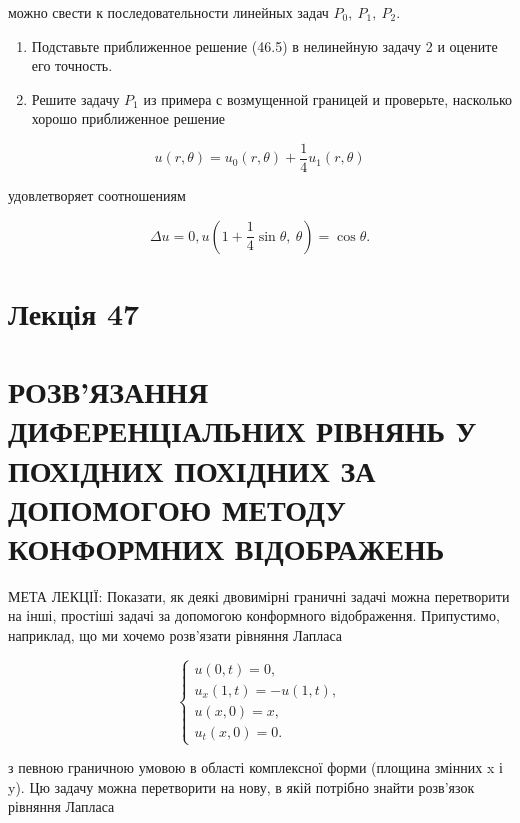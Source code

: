 \documentclass[
  ukrainian,
]{article}
\begin{document}
можно свести к последовательности линейных задач \(P_0,\ P_1,\ P_2\).

\begin{enumerate}
\def\labelenumi{\arabic{enumi}.}
\setcounter{enumi}{2}
\item
  Подставьте приближенное решение (46.5) в нелинейную задачу 2 и оцените
  его точность.
\item
  Решите задачу \(P_1\) из примера с возмущенной границей и проверьте,
  насколько хорошо приближенное решение
\end{enumerate}

\[
u(r,\theta) = u_0(r,\theta) + \frac{1}{4}u_1(r,\theta)
\]

удовлетворяет соотношениям

\[
\Delta u = 0,
u\left(1 + \frac{1}{4}\sin\theta,\ \theta\right) = \cos\theta.
\]

\section{Лекція 47}\label{ux43bux435ux43aux446ux456ux44f-47}

\section{РОЗВ'ЯЗАННЯ ДИФЕРЕНЦІАЛЬНИХ РІВНЯНЬ У ПОХІДНИХ ПОХІДНИХ ЗА
ДОПОМОГОЮ МЕТОДУ КОНФОРМНИХ
ВІДОБРАЖЕНЬ}\label{ux440ux43eux437ux432ux44fux437ux430ux43dux43dux44f-ux434ux438ux444ux435ux440ux435ux43dux446ux456ux430ux43bux44cux43dux438ux445-ux440ux456ux432ux43dux44fux43dux44c-ux443-ux43fux43eux445ux456ux434ux43dux438ux445-ux43fux43eux445ux456ux434ux43dux438ux445-ux437ux430-ux434ux43eux43fux43eux43cux43eux433ux43eux44e-ux43cux435ux442ux43eux434ux443-ux43aux43eux43dux444ux43eux440ux43cux43dux438ux445-ux432ux456ux434ux43eux431ux440ux430ux436ux435ux43dux44c}

МЕТА ЛЕКЦІЇ: Показати, як деякі двовимірні граничні задачі можна
перетворити на інші, простіші задачі за допомогою конформного
відображення. Припустимо, наприклад, що ми хочемо розв'язати рівняння
Лапласа

\[
\begin{cases} u(0, t) = 0, \\ u_x(1, t) = -u(1, t), \\ u(x, 0) = x, \\ u_t(x, 0) = 0. \end{cases}
\]

з певною граничною умовою в області комплексної форми (площина змінних x
і y). Цю задачу можна перетворити на нову, в якій потрібно знайти
розв'язок рівняння Лапласа
\end{document}
